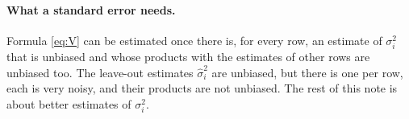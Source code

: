 \paragraph{What a standard error needs.} Formula \eqref{eq:V} can be estimated once there is, for every row, an
estimate of $\sigma_i^2$ that is unbiased and whose products with the estimates of other rows are unbiased too.
The leave-out estimates $\hat\sigma_i^2$ are unbiased, but there is one per row, each is very noisy, and
their products are not unbiased. The rest of this note is about better estimates of $\sigma_i^2$.

